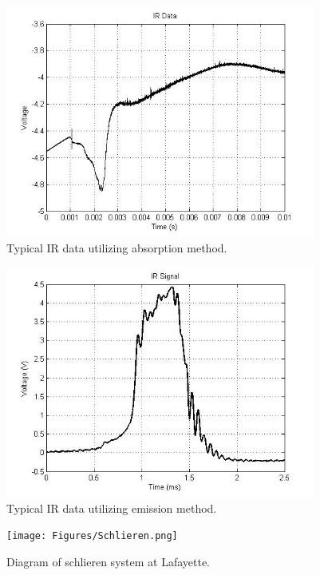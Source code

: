 \begin{figure}
\centering
\includegraphics[height = 3in]{Figures/absorption.jpg}
\caption[Typical IR data utilizing absorption method]{Typical IR data utilizing absorption method.}
\label{fig:IRabsorption}
\end{figure}

\begin{figure}
\centering
\includegraphics[height = 3in]{Figures/Co2NoPressure.jpg}
\caption[Typical IR data utilizing emission method]{Typical IR data utilizing emission method.}
\label{fig:IRemission}
\end{figure}

\begin{figure}
\centering
\texttt{[image: Figures/Schlieren.png]}
\caption[Schlieren Diagram]{Diagram of schlieren system at Lafayette.}
\label{fig:schlieren}
\end{figure}